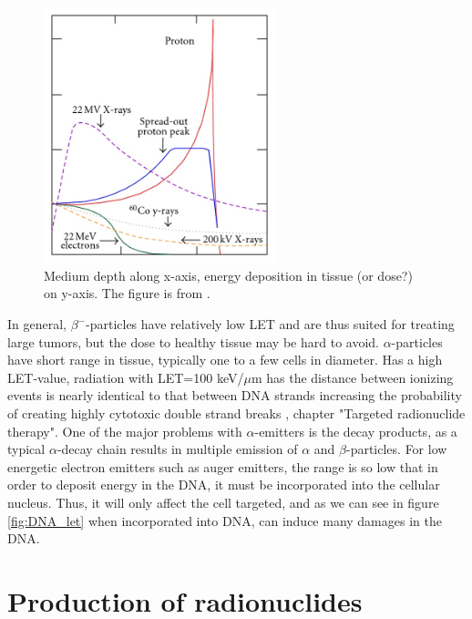 \begin{figure}
    \centering
    \includegraphics[width=0.6\textwidth]{Theory/Bragg-peak-and-Spread-Out-Bragg-Peak-SOBP-for-a-proton-beam-in-comparison-with-photon.jpg}
    \caption{Medium depth along x-axis, energy deposition in tissue (or dose?) on y-axis. The figure is from \cite{Cianchetti2012a}. }
    \label{fig:particle_interaction}
\end{figure}


In general,  $\beta^-$-particles have relatively low LET and are thus suited for treating large tumors, but the dose to healthy tissue may be hard to avoid. $\alpha$-particles have short range in tissue, typically one to a few cells in diameter. Has a high LET-value, radiation with LET=100 keV/$\mu$m has the distance between ionizing events is nearly identical to that between DNA strands increasing the probability of creating highly cytotoxic double strand breaks \cite{Vertes2011a}, chapter "Targeted radionuclide therapy". One of the major problems with $\alpha$-emitters is the decay products, as a typical $\alpha$-decay chain results in multiple emission of $\alpha$ and $\beta$-particles. For low energetic electron emitters such as auger emitters, the range is so low that in order to deposit energy in the DNA, it must be incorporated into the cellular nucleus. Thus, it will only affect the cell targeted, and as we can see in figure \ref{fig:DNA_let} when incorporated into DNA, can induce many damages in the DNA.  \\





\section{Production of radionuclides}

